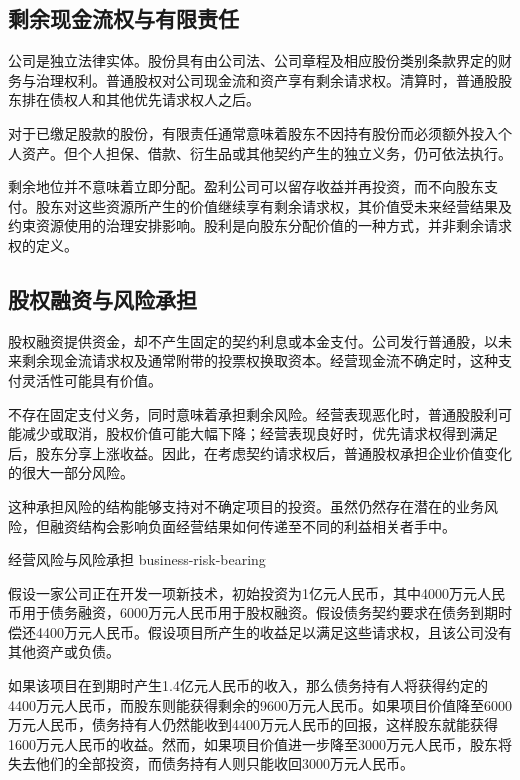 \subsection{剩余现金流权与有限责任}

公司是独立法律实体。股份具有由公司法、公司章程及相应股份类别条款界定的财务与治理权利。普通股权对公司现金流和资产享有剩余请求权。清算时，普通股股东排在债权人和其他优先请求权人之后。

对于已缴足股款的股份，有限责任通常意味着股东不因持有股份而必须额外投入个人资产。但个人担保、借款、衍生品或其他契约产生的独立义务，仍可依法执行。

剩余地位并不意味着立即分配。盈利公司可以留存收益并再投资，而不向股东支付。股东对这些资源所产生的价值继续享有剩余请求权，其价值受未来经营结果及约束资源使用的治理安排影响。股利是向股东分配价值的一种方式，并非剩余请求权的定义。

\subsection{股权融资与风险承担}

股权融资提供资金，却不产生固定的契约利息或本金支付。公司发行普通股，以未来剩余现金流请求权及通常附带的投票权换取资本。经营现金流不确定时，这种支付灵活性可能具有价值。

不存在固定支付义务，同时意味着承担剩余风险。经营表现恶化时，普通股股利可能减少或取消，股权价值可能大幅下降；经营表现良好时，优先请求权得到满足后，股东分享上涨收益。因此，在考虑契约请求权后，普通股权承担企业价值变化的很大一部分风险。

这种承担风险的结构能够支持对不确定项目的投资。虽然仍然存在潜在的业务风险，但融资结构会影响负面经营结果如何传递至不同的利益相关者手中。

\begin{example}{经营风险与风险承担}
{business-risk-bearing}

假设一家公司正在开发一项新技术，初始投资为1亿元人民币，其中4000万元人民币用于债务融资，6000万元人民币用于股权融资。假设债务契约要求在债务到期时偿还4400万元人民币。假设项目所产生的收益足以满足这些请求权，且该公司没有其他资产或负债。

如果该项目在到期时产生1.4亿元人民币的收入，那么债务持有人将获得约定的4400万元人民币，而股东则能获得剩余的9600万元人民币。如果项目价值降至6000万元人民币，债务持有人仍然能收到4400万元人民币的回报，这样股东就能获得1600万元人民币的收益。然而，如果项目价值进一步降至3000万元人民币，股东将失去他们的全部投资，而债务持有人则只能收回3000万元人民币。


\end{example}

